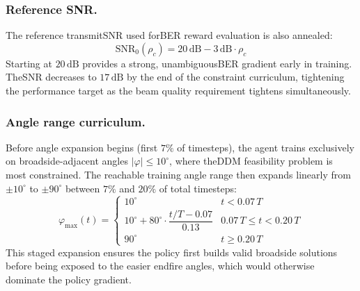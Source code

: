 \subsubsection{Reference SNR.}
The reference transmit\gls{SNR} used for\gls{BER} reward evaluation is also annealed:
\begin{equation}
    \mathrm{SNR}_0(\rho_c) = 20\,\text{dB} - 3\,\text{dB} \cdot \rho_c
\end{equation}
Starting at $20\,\text{dB}$ provides a strong, unambiguous\gls{BER} gradient early in training. The\gls{SNR} decreases to $17\,\text{dB}$ by the end of the constraint curriculum, tightening the performance target as the beam quality requirement tightens simultaneously.

\subsubsection{Angle range curriculum.}
Before angle expansion begins (first $7\%$ of timesteps), the agent trains exclusively on broadside-adjacent angles $|\varphi| \leq 10^\circ$, where the\gls{DDM} feasibility problem is most constrained. The reachable training angle range then expands linearly from $\pm 10^\circ$ to $\pm 90^\circ$ between $7\%$ and $20\%$ of total timesteps:
\begin{equation}
    \varphi_{\max}(t) =
    \begin{cases}
        10^\circ & t < 0.07\,T \\[4pt]
        10^\circ + 80^\circ \cdot \dfrac{t/T - 0.07}{0.13} & 0.07\,T \leq t < 0.20\,T \\[4pt]
        90^\circ & t \geq 0.20\,T
    \end{cases}
\end{equation}
This staged expansion ensures the policy first builds valid broadside solutions before being exposed to the easier endfire angles, which would otherwise dominate the policy gradient.

